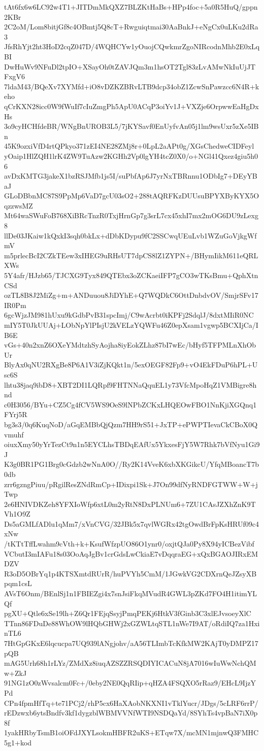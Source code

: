 tAt6fx6w6LC92w4T1+JITDmMkQXZ7BLZKtHaBs+HPp4foc+5a0R5HuQ/gppn2KBr
2C2oM/Lom8bitjGf8c4OBmtj5Q8cT+Rwguiqtmai30AaBnkJ+eNgCx0uLKu2dRa3
JfsRhYjt2ht3HoD2cqZ047D/4WQHCYw1yOuojCQwkmrZgoNIRcodnMhb2E0xLqBI
DwHuWv9NFuDl2tpIO+XSayOh0tZAVJQm3m1hsOT2Tgl83zLvAMwNkIuUjJTFxgV6
7ldaM43/BQeXv7XYMfd+iO8vDZKZBRvLTB9dcp34obZ1ZcwSnPawzcc6N4R+keho
qCrKXN28icc0W9fWuIf7cIuZmgPh5ApU0ACqP3oiYv1J+VXZje6OrpwwEaHgDxHs
3o9cyHCHfdeBR/WNgBnUROB3L5/7jKYSavf0EnUyfvAn05j1lm9wsUxr5zXe5IBn
45K9ozxiVfD4rtQPkyo371zEI4NE28ZMj8r+0LpL2aAPt0g/XGsChedweCIDFeyl
yOaip1HlZQH1lrK4ZW9TuAzw2KGHh2Vp0lgYH4tcZ0X0/o+NGl41Qxez4giu5h06
avDxKMTG3jakeX1bzRSJMfb1js5I/suPbfAp6J7yrNxTBRnnu1ODbIg7+DEyYBaJ
GLoDBbnMC87S9PpMp6VaD7gcU03sO2+288tAQRFKzDUUsuBPYXByKYX5OqzzwsMZ
Mt64waSWuFoB768XiBRcTnzR0TxjHrnGp7g3srL7cx45xhI7mx2mOG6DU9zLexg8
llDe03JKaiw1kQxkI3sqh0bkLx+dDbKDypu9fC2SSCwqUEuLvb1WZuGoVjkgWfmV
m5prlecBcI2CZkTEew3xIHEG9uRHsUT7dpCS8lZ1ZYPN+/BHymIikM611eQRLXWs
5Y4afr/HJzb65/TJCXG9Tyx849QTEbx3oZCKaeiIFP7gCO3wTKsBmu+QphXtnCSd
ozTL8B8J2MiZg+m+ANDuuou8JiDYhE+Q7WQDkC6OttDnbdvOV/SmjrSFv17IR0Pm
6gcWjzJM981hUxu9kGdbPvB31spcImj/C9wAcrbt0iKPFj2SdqlJ/8dxtMIiR0NC
mIY5T0JkUUAj+LObNpYlPIsjU2kVELzYQWFu46Z0epXsam1vgwp5BCXIjCa/IB6E
vGs+40n2xnZ6OXeYMdtzhSyAojha8iyEokZLhz87bI7wEc/bHyf5TFPMLnXhObUr
BlyAx0qNU2RXgBe8P6A1V3iZjKQkt1n/5exOEGF82Fp9+vO4EkFDuP6hPL+Usc6S
lhtu38jaq9ibD8+XBT2DI1LQRpf9FHTNNaQquEL1y73VfcMpoHqZ1VMBigre8hnd
c0H3056/BYu+CZ5Cg4fCV5WS9OeS9lNPbZCKxLHQEOwFBO1NnKjiXGQnq1FYrj5R
bg3s3/0q6KuqNoD/aGqEMBbQjQzm7HH9rS51+JxTP+ePWPTIevaCkCBoX0Qvmuhf
oiuxXmy50yYrTezCt9n1n5EYCLhsTBDqEAfUx5YkxesFjY5W7Rhk7bVfNyu1Gi9J
K3g0BR1PG1Brg0cGdzb2wNnA0O//Ry2K14VveK6xbXKGikcU/YfqMBoancT7b0db
zrr6gzngPiuu/pRgilResZNdRmCp+IDixpi1Sk+J7On99dfNyRNDFGTWW+W+jTwp
2e6HNIVDKZeh8YFXIoWfp6xtL0m2yRtN8DxPLNUm6+7ZU1CAsJZXhZnK9TVh1O9Z
Ds5aGMLfADlu1qMm7/xVnCVG/32JBk5x7qvlWGRx42tgOwdBrFpKsHRUf09c4xNw
/tKTtTffLwahm9cVth+k+KsufWfzpUO86O1ynr0/oxjtQJa0Py8X94yICBezVibf
VCbutI3mIAFu18s03OoAqJgBv1crGdsLwCkiaE7vDqqraEG+xQxBGAOJIRxEMDZV
R3oD5OBrYq1p4KTSXmtdRUrR/huPVYh5CmM/1JGwkVG2CDXrnQeJZsyXBpqm1csL
AVsT6Onm/BEnlSj1n1FBIEZgi4x7snJsiFkqMVudR4GWL3pZKd7FO4H1itimYLQf
pgXU+Qtle6xSe19lh+Z6Qr1FEjqSsyjPmqPEKj6HtkV3fGinb3C3xlEJvsoeyXlC
TTnn86FDuDe88WhOW9lHQbGHWj2xGZWLtqSTL1nWe7I9AT/oRdiIQ7za1HxinTL6
7HtGpGKxE6lqcucpa7UQ939lANgjohv/aA56TLImbTcKfkMW2KAjT0yDMPZ17pQB
mAG5Urh68h1rLYz/ZMdXz8iuqAZSZZRSQDIYICACuN8jA7016wIuWwNchQMw+ZkJ
91NG1zO0zWvsalcm0Fc+/0eby2NE0QqRIip+qHZA4FSQXO5rRaz9/EHcL9IjzYPd
CPn4fpmHfTq+te71PCj2/rhP5cx6HaXAobNKXNI1vTklYucr/JDgs/5cLRF6rrP/
rEDzwxb6ytsBndfv3kf1dygzblWBMVVNfWTI9NSDQaYd/8SYhTs4vpBaN7iX0p8f
1yakHRbyTsmB1oiOFdJXYLsokmHBFR2uKS+ETqw7X/mcMN1mjnwQ3FMHC5g1+kod
